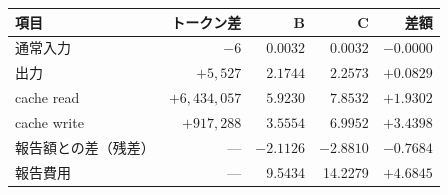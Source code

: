 \begin{tabular}{lrrrr}
\toprule 項目 & トークン差 & B & C & 差額\\\midrule
通常入力 & $-6$ & $0.0032$ & $0.0032$ & $-0.0000$ \\
出力 & $+5,527$ & $2.1744$ & $2.2573$ & $+0.0829$ \\
cache read & $+6,434,057$ & $5.9230$ & $7.8532$ & $+1.9302$ \\
cache write & $+917,288$ & $3.5554$ & $6.9952$ & $+3.4398$ \\
報告額との差（残差） & --- & $-2.1126$ & $-2.8810$ & $-0.7684$ \\
\midrule 報告費用 & --- & 9.5434 & 14.2279 & $+4.6845$ \\
\bottomrule
\end{tabular}
